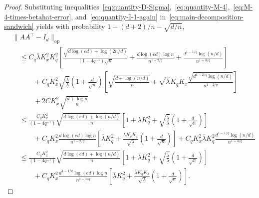 \documentclass[11pt]{article}
\begin{document}
\begin{appendices}
\begin{proof}
Substituting inequalities~\eqref{eq:quantity-D-Sigma},~\eqref{eq:quantity-M-4},~\eqref{eq:M-4-times-betahat-error}, and~\eqref{eq:quantity-I-1-again} in~\eqref{eq:main-decomposition-sandwich} yields with probability $1 - (d+2)/n - \sqrt{d/n}$,
\begin{equation}
\begin{split}
&\|AA^{\top} - I_d\|_{\mathrm{op}}\\ 
&\quad\le C_q\overline{\lambda}K_x^2K_q^2\left[\frac{\sqrt{d\log(ed) + \log(2n/d)}}{(1-4q^{-1})\sqrt{n}} + \frac{d\log(ed)\log n}{n^{1-2/q}} + \frac{d^{1-1/q}\log(n/d)}{n^{1-3/q}}\right]\\
&\quad\qquad+ C_qK_x^2\sqrt{\frac{\overline{\lambda}}{\underline{\lambda}}}\left(1 + \frac{d}{\sqrt{n}}\right)\left[\sqrt{\frac{d + \log({n}/{d})}{n}} + \sqrt{\overline{\lambda}}K_qK_x\frac{\sqrt{d^{1 - 2/q}\log({n}/{d})}}{n^{1 - 2/q}}\right]\\
&\quad\qquad+ 2CK_x^2\sqrt{\frac{d + \log n}{n}}\\
&\quad\le \frac{C_qK_x^2}{(1-4q^{-1})}\sqrt{\frac{d\log(ed) + \log(n/d)}{n}}\left[1 + \overline{\lambda} K_q^2 + \sqrt{\frac{\overline{\lambda}}{\underline{\lambda}}}\left(1 + \frac{d}{\sqrt{n}}\right)\right]\\
&\quad\qquad+ C_qK_x^2\frac{d\log(ed)\log n}{n^{1-2/q}}\left[\overline{\lambda}K_q^2 + \frac{\overline{\lambda}K_qK_x}{\sqrt{\underline{\lambda}}}\left(1 + \frac{d}{\sqrt{n}}\right)\right] + C_qK_x^2\overline{\lambda}K_q^2\frac{d^{1-1/q}\log(n/d)}{n^{1-3/q}}\\
&\quad\le \frac{C_qK_x^2}{(1-4q^{-1})}\sqrt{\frac{d\log(ed) + \log(n/d)}{n}}\left[1 + \overline{\lambda} K_q^2 + \sqrt{\frac{\overline{\lambda}}{\underline{\lambda}}}\left(1 + \frac{d}{\sqrt{n}}\right)\right]\\
&\quad\qquad+ C_qK_x^2\frac{d^{1-1/q}\log(ed)\log n}{n^{1-3/q}}\left[\overline{\lambda}K_q^2 + \frac{\overline{\lambda}K_qK_x}{\sqrt{\underline{\lambda}}}\left(1 + \frac{d}{\sqrt{n}}\right)\right].
\end{split}
\end{equation}
\end{proof}

\end{appendices}
\end{document}
